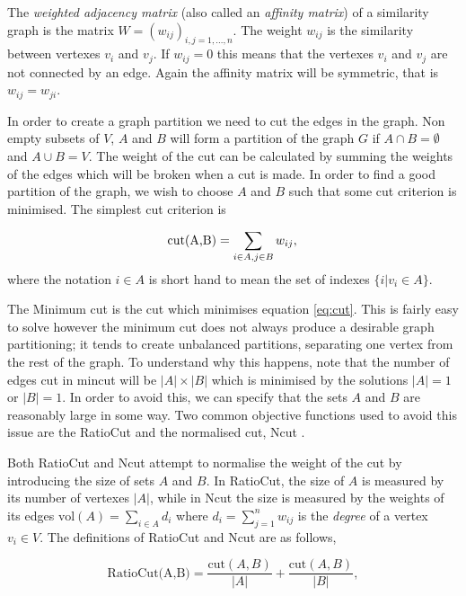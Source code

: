 The \textit{weighted adjacency matrix} (also called an \textit{affinity matrix}) of a similarity graph is the matrix $W = (w_{ij})_{i,j = 1,\ldots, n}$. The weight $w_{ij}$ is the similarity between vertexes $v_i$ and $v_j$.  If $w_{ij}=0$ this means that the vertexes $v_i$ and $v_j$ are not connected by an edge. Again the affinity matrix will be symmetric, that is $w_{ij} = w_{ji}$. 

In order to create a graph partition we need to cut the edges in the graph. Non empty subsets of $V$, $A$ and $B$ will form a partition of the graph $G$ if $A \cap B = \emptyset  $ and $A \cup B = V$.  
The weight of the cut can be calculated by summing the weights of the edges which will be broken when a cut is made. In order to find a good partition of the graph, we wish to choose $A$ and $B$  such that some cut criterion is minimised.  The simplest cut criterion is

\begin{equation}
  \text{cut(A,B)} = \sum_{i \in A, j \in B} w_{ij},\\
  \label{eq:cut}
\end{equation}
where the notation $i \in A$ is short hand to mean the set of indexes $\{ i | v_i \in A \}$.

The Minimum cut \citep{Wu1993} is the cut which minimises equation \eqref{eq:cut}. This is fairly easy to solve \citep{Stoer1997} however the  minimum cut does not always produce a desirable graph partitioning; it tends to create unbalanced partitions, separating one vertex from the rest of the graph. To understand why this happens, note that the number of edges cut in mincut will be  $|A| \times |B|$ which is minimised by the solutions $|A| = 1$ or $|B| = 1$. In order to avoid this, we can specify that the sets $A$ and $B$ are reasonably large in some way. Two common objective functions used to avoid this issue are the RatioCut \citep{Hagen1992} and the normalised cut, Ncut \citep{Malik2000}. 

Both RatioCut and Ncut attempt to normalise the weight of the cut by introducing the size of sets $A$ and $B$. In RatioCut, the size of $A$ is measured by its number of vertexes $|A|$, while in Ncut the size is measured by the weights of its edges $\text{vol}(A) = \sum_{i \in A}d_i$ where $d_i= \sum_{j = 1}^n w_{ij}$ is the \textit{degree} of a vertex $v_i \in V$. The definitions of RatioCut and Ncut are as follows, 

\begin{equation}
  \text{RatioCut(A,B)} = \frac{\text{cut} (A, B)}{|A|} + \frac{\text{cut}(A, B)}{|B|}, 
    \label{eq:ratiocut}
\end{equation}

